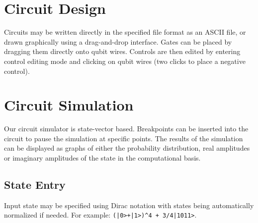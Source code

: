 \documentclass[a4paper,UKenglish]{lipics}
\begin{document}
\section{Circuit Design}
Circuits may be written directly in the specified file format as an ASCII file, or drawn graphically using a drag-and-drop interface.  
Gates can be placed by dragging them directly onto qubit wires.
Controls are then edited by entering control editing mode and clicking on qubit wires (two clicks to place a negative control).

\section{Circuit Simulation}
Our circuit simulator is state-vector based.
Breakpoints can be inserted into the circuit to pause the simulation at specific points.
The results of the simulation can be displayed as graphs of either the probability distribution, real amplitudes or imaginary amplitudes of the state in the computational basis.
\subsection{State Entry}
Input state may be specified using Dirac notation with states being automatically normalized if needed.
For example: \verb$(|0>+|1>)^4 + 3/4|1011>$.




%



\end{document}
